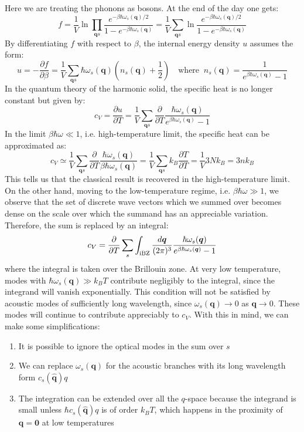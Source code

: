 \documentclass[10.75pt,a4paper,openright,bottom=2cm]{article}
\renewcommand{\Vec}[1]{\boldsymbol{#1}}
\newcommand{\RN}[1]{%
  \textup{\uppercase\expandafter{\romannumeral#1}}%
}
\begin{document}
Here we are treating the phonons as bosons. At the end of the day one gets:
\[
f=\frac{1}{V}\ln{\prod_{\Vec{q}s}\frac{e^{-\beta\hbar\omega_s(\Vec{q})/2}}{1-e^{-\beta\hbar\omega_s(\Vec{q})}}}=\frac{1}{V}\sum_{\Vec{q}s}\ln{\frac{e^{-\beta\hbar\omega_s(\Vec{q})/2}}{1-e^{-\beta\hbar\omega_s(\Vec{q})}}}
\]
By differentiating $f$ with respect to $\beta$, the internal energy density $u$ assumes the form:
\[
u=-\frac{\partial f}{\partial\beta}=\frac{1}{V}\sum_{\Vec{q}s}\hbar\omega_s(\Vec{q})\left(n_s(\Vec{q})+\frac{1}{2}\right) \quad \text{where}\;\; n_s(\Vec{q})=\frac{1}{e^{\beta\hbar\omega_s(\Vec{q})}-1}
\]
In the quantum theory of the harmonic solid, the specific heat is no longer constant but given by:
\[
c_V=\frac{\partial u}{\partial T}=\frac{1}{V}\sum_{\Vec{q}s}\frac{\partial}{\partial T}\frac{\hbar\omega_s(\Vec{q})}{e^{\beta\hbar\omega_s(\Vec{q})}-1}
\]
In the limit $\beta\hbar\omega\ll1$, i.e. high-temperature limit, the specific heat can be approximated as:
\[
c_V\simeq\frac{1}{V}\sum_{\Vec{q}s}\frac{\partial}{\partial T}\frac{\hbar\omega_s(\Vec{q})}{\beta\hbar\omega_s(\Vec{q})}=\frac{1}{V}\sum_{\Vec{q}s}k_B\frac{\partial T}{\partial T}=\frac{1}{V}3Nk_B=3nk_B
\]
This tells us that the classical result is recovered in the high-temperature limit.\\
On the other hand, moving to the low-temperature regime, i.e. $\beta\hbar\omega\gg1$, we observe that the set of discrete wave vectors which we summed over becomes dense on the scale over which the summand has an appreciable variation. Therefore, the sum is replaced by an integral:
\begin{equation}
\label{general}
c_V=\frac{\partial}{\partial T}\sum_s\int_{\text{\RN{1}BZ}}\frac{d\Vec{q}}{(2\pi)^3}\frac{\hbar\omega_s(\Vec{q})}{e^{\beta\hbar\omega_s(\Vec{q})}-1}
\end{equation}
where the integral is taken over the  Brillouin zone. At very low temperature, modes with $\hbar\omega_s(\Vec{q})\gg k_BT$ contribute negligibly to the integral, since the integrand will vanish exponentially. This condition will not be satisfied by acoustic modes of sufficiently long wavelength, since $\omega_s(\Vec{q})\to0$ as $\Vec{q}\to0$. These modes will continue to contribute appreciably to $c_V$. With this in mind, we can make some simplifications:
\begin{enumerate}
    \item It is possible to ignore the optical modes in the sum over $s$
    \item We can replace $\omega_s(\Vec{q})$ for the acoustic branches with its long wavelength form $c_s(\hat{\Vec{q}})q$
    \item The integration can be extended over all the $q$-space because the integrand is small unless $\hbar c_s(\hat{\Vec{q}})q$ is of order $k_BT$, which happens in the proximity of $\Vec{q}=\Vec{0}$ at low temperatures
\end{enumerate}
\end{document}
